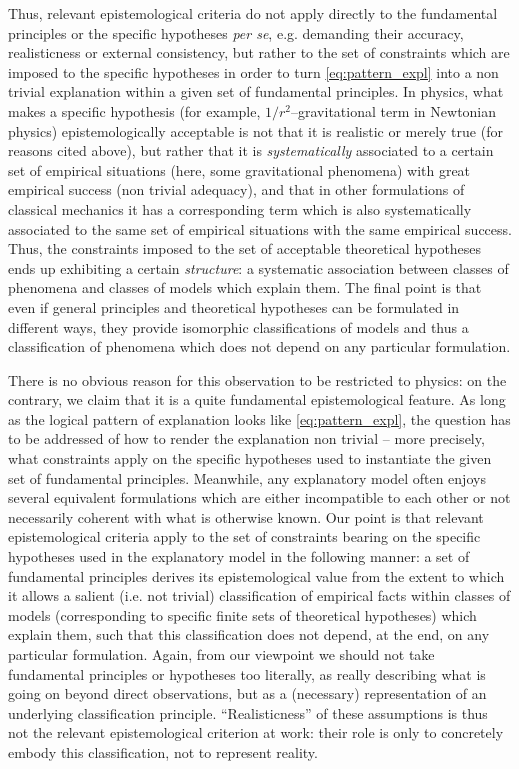 \documentclass[a4paper,11pt]{article}
\theoremstyle{definition}
\begin{document}
Thus, relevant epistemological criteria do not apply directly to the fundamental principles or the specific hypotheses \textit{per se}, e.g. demanding their accuracy, realisticness or external consistency, but rather to the set of constraints which are imposed to the specific hypotheses in order to turn \eqref{eq:pattern_expl} into a non trivial explanation within a given set of fundamental principles. In physics, what makes a specific hypothesis (for example, $1/r^2$--gravitational term in Newtonian physics) epistemologically acceptable is not that it is realistic or merely true (for reasons cited above), but rather that it is \textit{systematically} associated to a certain set of empirical situations (here, some gravitational phenomena) with great empirical success (non trivial adequacy), and that in other formulations of classical mechanics it has a corresponding term which is also systematically associated to the same set of empirical situations with the same empirical success. Thus, the constraints imposed to the set of acceptable theoretical hypotheses ends up exhibiting a certain \textit{structure}: a systematic association between classes of phenomena and classes of models which explain them. The final point is that even if general principles and theoretical hypotheses can be formulated in different ways, they provide isomorphic classifications of models and thus a classification of phenomena which does not depend on any particular formulation. 

There is no obvious reason for this observation to be restricted to physics: on the contrary, we claim that it is a quite fundamental epistemological feature. As long as the logical pattern of explanation looks like \eqref{eq:pattern_expl}, the question has to be addressed of how to render the explanation non trivial -- more precisely, what constraints apply on the specific hypotheses used to instantiate the given set of fundamental principles. Meanwhile, any explanatory model often enjoys several equivalent formulations which are either incompatible to each other or not necessarily coherent with what is otherwise known. Our point is that relevant epistemological criteria apply to the set of constraints bearing on the specific hypotheses used in the explanatory model in the following manner: a set of fundamental principles derives its epistemological value from the extent to which it allows a salient (i.e. not trivial) classification of empirical facts within classes of models (corresponding to specific finite sets of theoretical hypotheses) which explain them, such that this classification does not depend, at the end, on any particular formulation. Again, from our viewpoint we should not take fundamental principles or hypotheses too literally, as really describing what is going on beyond direct observations, but as a (necessary) representation of an underlying classification principle. ``Realisticness'' of these assumptions is thus not the relevant epistemological criterion at work: their role is only to concretely embody this classification, not to represent reality. 
\end{document}

